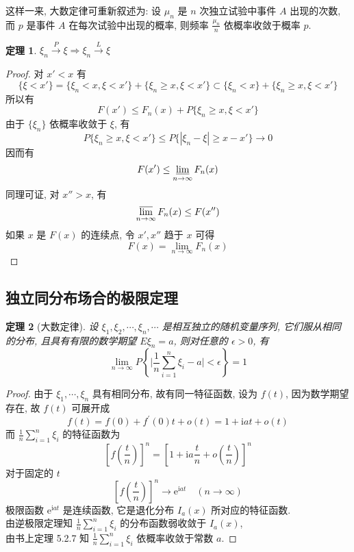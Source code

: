 \documentclass[12pt,a4paper]{article}
\newtheorem{thm}{定理}[subsection]  %
\begin{document}
这样一来, 大数定律可重新叙述为: 设 $\mu_n$ 是 $n$ 次独立试验中事件 $A$ 出现的次数, 而 $p$ 是事件 $A$ 在每次试验中出现的概率, 则频率 $\frac{\mu_n}{n}$ 依概率收敛于概率 $p$.

\begin{thm}
    $\xi_n \overset{P}{\to} \xi \Rightarrow \xi_n \overset{L}{\to} \xi$
\end{thm}

\begin{proof}
    对 $x' < x$ 有
    \[\{\xi < x'\} = \{\xi_n < x, \xi < x'\} + \{\xi_n \geq x, \xi < x'\} \subset \{\xi_n < x\} + \{\xi_n \geq x, \xi < x'\}\]
    所以有\[F(x') \leq F_n(x) + P\{\xi_n \geq x, \xi < x'\}\]
    由于 $\{\xi_n\}$ 依概率收敛于 $\xi$, 有
    \[P\{\xi_n \geq x, \xi<x'\} \leq P\{|\xi_n - \xi| \geq x-x'\} \to 0\]
    因而有 \[F(x') \leq \varliminf\limits_{n \to \infty} F_n(x) \]
    同理可证, 对 $x'' > x$, 有
    \[\varlimsup\limits_{n \to \infty} F_n(x) \leq F(x'')\]
    如果 $x$ 是 $F(x)$ 的连续点, 令 $x',x''$ 趋于 $x$ 可得
    \[F(x) = \lim\limits_{n \to \infty} F_n(x)\]
\end{proof}

\subsection{独立同分布场合的极限定理}

\begin{thm}[大数定律]
    设 $\xi_1, \xi_2, \cdots, \xi_n, \cdots$ 是相互独立的随机变量序列, 它们服从相同的分布, 且具有有限的数学期望 $E \xi_n = a$, 则对任意的 $\epsilon > 0$, 有
    \[\lim_{n \to \infty} P \left\{ \Big|\frac{1}{n} \sum\limits_{i=1}^{n} \xi_i  - a \Big| < \epsilon \right\} = 1\]
\end{thm}

\begin{proof}
    由于 $\xi_1, \cdots, \xi_n$ 具有相同分布, 故有同一特征函数, 设为 $f(t)$, 因为数学期望存在, 故 $f(t)$ 可展开成
    \[ f(t) = f(0) + f^{\prime}(0) t + o(t) = 1 + \mathrm{i} at + o(t) \]
    而 $\frac{1}{n} \sum\limits_{i=1}^n \xi_i$ 的特征函数为
    \[\left[ f\left(\frac{t}{n}\right) \right]^n = \left[ 1 + \mathrm{i}a \frac{t}{n} + o\left( \frac{t}{n} \right) \right]^n\]
    对于固定的 $t$ \[\left[ f\left(\frac{t}{n}\right) \right]^n \to \mathrm{e}^{\mathrm{i}at}  \quad (n \to \infty)\]
    极限函数 $\mathrm{e}^{\mathrm{i}at}$ 是连续函数, 它是退化分布 $I_a(x)$ 所对应的特征函数. \\
    由逆极限定理知 $\frac{1}{n} \sum\limits_{i=1}^n \xi_i$ 的分布函数弱收敛于 $I_a(x)$, \\
    由书上定理 5.2.7 知 $\frac{1}{n} \sum\limits_{i=1}^n \xi_i$ 依概率收敛于常数 $a$.
\end{proof}
\end{document}
